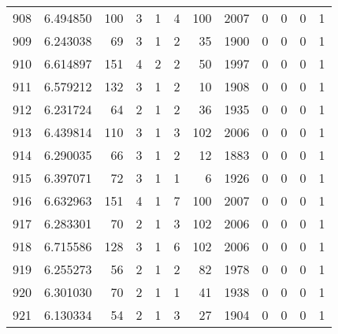 \begin{tabular}{lrrrrrrrrrrr}
908 &  6.494850 &  100 &      3 &        1 &      4 &             100 &  2007 &               0 &               0 &               0 &               1 \\
909 &  6.243038 &   69 &      3 &        1 &      2 &              35 &  1900 &               0 &               0 &               0 &               1 \\
910 &  6.614897 &  151 &      4 &        2 &      2 &              50 &  1997 &               0 &               0 &               0 &               1 \\
911 &  6.579212 &  132 &      3 &        1 &      2 &              10 &  1908 &               0 &               0 &               0 &               1 \\
912 &  6.231724 &   64 &      2 &        1 &      2 &              36 &  1935 &               0 &               0 &               0 &               1 \\
913 &  6.439814 &  110 &      3 &        1 &      3 &             102 &  2006 &               0 &               0 &               0 &               1 \\
914 &  6.290035 &   66 &      3 &        1 &      2 &              12 &  1883 &               0 &               0 &               0 &               1 \\
915 &  6.397071 &   72 &      3 &        1 &      1 &               6 &  1926 &               0 &               0 &               0 &               1 \\
916 &  6.632963 &  151 &      4 &        1 &      7 &             100 &  2007 &               0 &               0 &               0 &               1 \\
917 &  6.283301 &   70 &      2 &        1 &      3 &             102 &  2006 &               0 &               0 &               0 &               1 \\
918 &  6.715586 &  128 &      3 &        1 &      6 &             102 &  2006 &               0 &               0 &               0 &               1 \\
919 &  6.255273 &   56 &      2 &        1 &      2 &              82 &  1978 &               0 &               0 &               0 &               1 \\
920 &  6.301030 &   70 &      2 &        1 &      1 &              41 &  1938 &               0 &               0 &               0 &               1 \\
921 &  6.130334 &   54 &      2 &        1 &      3 &              27 &  1904 &               0 &               0 &               0 &               1 \\

\end{tabular}

